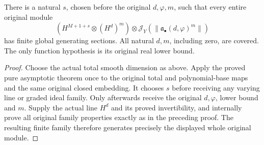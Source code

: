\begin{theorem}
\label{thm:c0n-original-asymptotic-pure-generators}
\leanok
{}
There is a natural $s$, chosen before the original $d,\varphi,m$, such
that every entire original module
\[
 (H^{M+1+s}\otimes(H^d)^m)\otimes
       \mathcal J_Y(\|\mathfrak a_\bullet(d,\varphi)^m\|)
\]
has finite global generating sections. All natural $d,m$, including zero,
are covered. The only function hypothesis is its original real lower bound.
\end{theorem}
\begin{proof}
Choose the actual total smooth dimension as above. Apply the proved pure
asymptotic theorem once to the original total and polynomial-base maps
and the same original closed embedding. It chooses $s$ before receiving
any varying line or graded ideal family. Only afterwards receive the
original $d,\varphi$, lower bound and $m$. Supply the actual line $H^d$
and its proved invertibility, and internally prove all original family
properties exactly as in the preceding proof. The resulting finite family
therefore generates precisely the displayed whole original module.
\end{proof}

